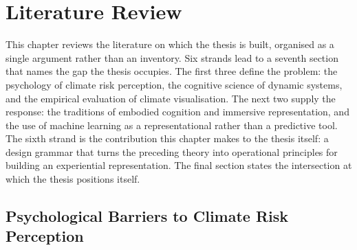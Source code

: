 
\chapter{Literature Review}
\label{ch:literature}

This chapter reviews the literature on which the thesis is built, organised as a single argument rather than an inventory. Six strands lead to a seventh section that names the gap the thesis occupies. The first three define the problem: the psychology of climate risk perception, the cognitive science of dynamic systems, and the empirical evaluation of climate visualisation. The next two supply the response: the traditions of embodied cognition and immersive representation, and the use of machine learning as a representational rather than a predictive tool. The sixth strand is the contribution this chapter makes to the thesis itself: a design grammar that turns the preceding theory into operational principles for building an experiential representation. The final section states the intersection at which the thesis positions itself.

\section{Psychological Barriers to Climate Risk Perception}
\label{sec:psych-barriers}

